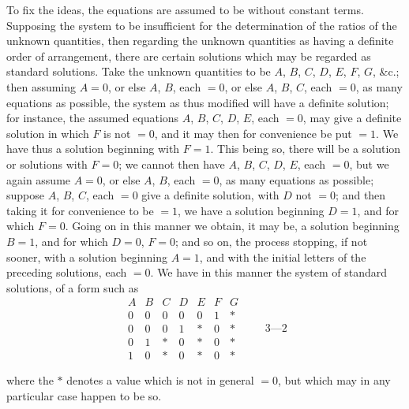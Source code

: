 \documentclass[11pt,a4paper]{article}
\providecommand{\textsc}[1]{{\scshape #1}}
\begin{document}
\medskip
To fix the ideas, the equations are assumed to be without constant terms. Supposing the system to be insufficient for the determination of the ratios of the unknown quantities, then regarding the unknown quantities as having a definite order of arrangement, there are certain solutions which may be regarded as standard solutions. Take the unknown quantities to be $A$, $B$, $C$, $D$, $E$, $F$, $G$, \&c.; then assuming $A = 0$, or else $A$, $B$, each $=0$, or else $A$, $B$, $C$, each $=0$, as many equations as possible, the system as thus modified will have a definite solution; for instance, the assumed equations $A$, $B$, $C$, $D$, $E$, each $=0$, may give a definite solution in which $F$ is not $=0$, and it may then for convenience be put $=1$. We have thus a solution beginning with $F = 1$. This being so, there will be a solution or solutions with $F = 0$; we cannot then have $A$, $B$, $C$, $D$, $E$, each $=0$, but we again assume $A=0$, or else $A$, $B$, each $=0$, as many equations as possible; suppose $A$, $B$, $C$, each $=0$ give a definite solution, with $D$ not $=0$; and then taking it for convenience to be $=1$, we have a solution beginning $D=1$, and for which $F=0$. Going on in this manner we obtain, it may be, a solution beginning $B = 1$, and for which $D=0$, $F=0$; and so on, the process stopping, if not sooner, with a solution beginning $A=1$, and with the initial letters of the preceding solutions, each $=0$. We have in this manner the system of standard solutions, of a form such as
\[
\begin{array}{ccccccc}
A & B & C & D & E & F & G\\\hline
0 & 0 & 0 & 0 & 0 & 1 & *\\
0 & 0 & 0 & 1 & * & 0 & *\\
0 & 1 & * & 0 & * & 0 & *\\
1 & 0 & * & 0 & * & 0 & *
\end{array}
\hspace{2em}3\text{---}2
\]
\clearpage

\fancyhead[C]{\small\textsc{note on the standard solutions}}
\fancyhead[R]{\small [800}

\thispagestyle{plain}
\noindent where the $*$ denotes a value which is not in general $=0$, but which may in any particular case happen to be so.
\end{document}
